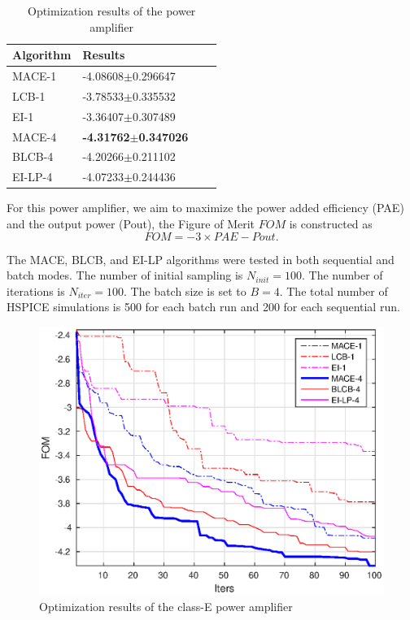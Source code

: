 \begin{table}[!htb]
    \centering
    \caption{Optimization results of the power amplifier}
    \vskip 0.15in
    \label{tab:result_PA}
    \begin{tabular}{llll}
        \toprule
        Algorithm & Results               \\ \midrule
        MACE-1    & -4.08608$\pm$0.296647 \\
        LCB-1     & -3.78533$\pm$0.335532 \\
        EI-1      & -3.36407$\pm$0.307489 \\
        MACE-4    & \textbf{-4.31762$\pm$0.347026} \\
        BLCB-4    & -4.20266$\pm$0.211102 \\
        EI-LP-4   & -4.07233$\pm$0.244436 \\
        \bottomrule
    \end{tabular}
    \vskip -0.1in
\end{table}


For this power amplifier, we aim to maximize the power added efficiency (PAE) and the output power (Pout), the Figure of Merit $FOM$ is constructed as
$$
\mathit{FOM} = -3 \times \mathit{PAE} - \mathit{Pout}.
$$

The MACE, BLCB, and EI-LP algorithms were tested in both sequential and batch
modes. The number of initial sampling is $N_{init} = 100$. The number of
iterations is $N_{iter} = 100$. The batch size is set to $B = 4$. The total
number of HSPICE simulations is 500 for each batch run and 200 for each
sequential run.

\begin{figure}[!htb]
    \begin{center}
        \centerline{\includegraphics[width=\columnwidth]{./img/ClassE_mean.eps}}
        \caption{Optimization results of the class-E power amplifier}
        \label{fig:resClassE}
    \end{center}
    \vskip -0.2in
\end{figure}



